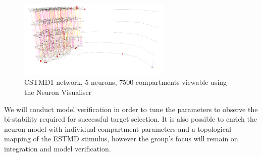 \begin{figure}[!ht]
    \centering
    \includegraphics[width = 0.65\textwidth]{Figures/neuronvisualiser2.png}
    \caption{CSTMD1 network, 5 neurons, 7500 compartments viewable using the Neuron Visualiser}
    \label{fig:neuron_visualiser}
\end{figure}

We will conduct model verification in order to tune the parameters to observe the bi-stability required for successful target selection. It is also possible to enrich the neuron model with individual compartment parameters and a topological mapping of the ESTMD stimulus, however the group's focus will remain on integration and model verification.

